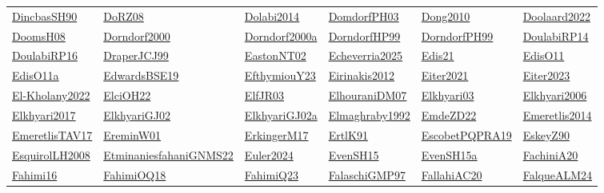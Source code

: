 \begin{longtable}{*{6}{l}}
\hyperref[detail:DincbasSH90]{DincbasSH90} & \hyperref[detail:DoRZ08]{DoRZ08} & \hyperref[detail:Dolabi2014]{Dolabi2014} & \hyperref[detail:DomdorfPH03]{DomdorfPH03} & \hyperref[detail:Dong2010]{Dong2010} & \hyperref[detail:Doolaard2022]{Doolaard2022}\\ 
\hyperref[detail:DoomsH08]{DoomsH08} & \hyperref[detail:Dorndorf2000]{Dorndorf2000} & \hyperref[detail:Dorndorf2000a]{Dorndorf2000a} & \hyperref[detail:DorndorfHP99]{DorndorfHP99} & \hyperref[detail:DorndorfPH99]{DorndorfPH99} & \hyperref[detail:DoulabiRP14]{DoulabiRP14}\\ 
\hyperref[detail:DoulabiRP16]{DoulabiRP16} & \hyperref[detail:DraperJCJ99]{DraperJCJ99} & \hyperref[detail:EastonNT02]{EastonNT02} & \hyperref[detail:Echeverria2025]{Echeverria2025} & \hyperref[detail:Edis21]{Edis21} & \hyperref[detail:EdisO11]{EdisO11}\\ 
\hyperref[detail:EdisO11a]{EdisO11a} & \hyperref[detail:EdwardsBSE19]{EdwardsBSE19} & \hyperref[detail:EfthymiouY23]{EfthymiouY23} & \hyperref[detail:Eirinakis2012]{Eirinakis2012} & \hyperref[detail:Eiter2021]{Eiter2021} & \hyperref[detail:Eiter2023]{Eiter2023}\\ 
\hyperref[detail:El-Kholany2022]{El-Kholany2022} & \hyperref[detail:ElciOH22]{ElciOH22} & \hyperref[detail:ElfJR03]{ElfJR03} & \hyperref[detail:ElhouraniDM07]{ElhouraniDM07} & \hyperref[detail:Elkhyari03]{Elkhyari03} & \hyperref[detail:Elkhyari2006]{Elkhyari2006}\\ 
\hyperref[detail:Elkhyari2017]{Elkhyari2017} & \hyperref[detail:ElkhyariGJ02]{ElkhyariGJ02} & \hyperref[detail:ElkhyariGJ02a]{ElkhyariGJ02a} & \hyperref[detail:Elmaghraby1992]{Elmaghraby1992} & \hyperref[detail:EmdeZD22]{EmdeZD22} & \hyperref[detail:Emeretlis2014]{Emeretlis2014}\\ 
\hyperref[detail:EmeretlisTAV17]{EmeretlisTAV17} & \hyperref[detail:EreminW01]{EreminW01} & \hyperref[detail:ErkingerM17]{ErkingerM17} & \hyperref[detail:ErtlK91]{ErtlK91} & \hyperref[detail:EscobetPQPRA19]{EscobetPQPRA19} & \hyperref[detail:EskeyZ90]{EskeyZ90}\\ 
\hyperref[detail:EsquirolLH2008]{EsquirolLH2008} & \hyperref[detail:EtminaniesfahaniGNMS22]{EtminaniesfahaniGNMS22} & \hyperref[detail:Euler2024]{Euler2024} & \hyperref[detail:EvenSH15]{EvenSH15} & \hyperref[detail:EvenSH15a]{EvenSH15a} & \hyperref[detail:FachiniA20]{FachiniA20}\\ 
\hyperref[detail:Fahimi16]{Fahimi16} & \hyperref[detail:FahimiOQ18]{FahimiOQ18} & \hyperref[detail:FahimiQ23]{FahimiQ23} & \hyperref[detail:FalaschiGMP97]{FalaschiGMP97} & \hyperref[detail:FallahiAC20]{FallahiAC20} & \hyperref[detail:FalqueALM24]{FalqueALM24}\\ 

\end{longtable}
